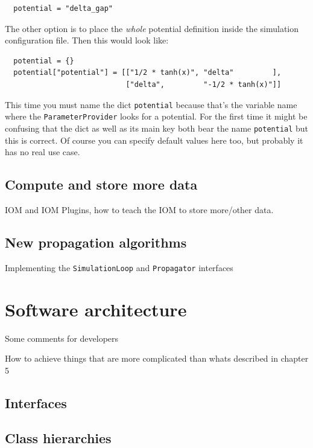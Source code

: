 \documentclass[a4paper,10pt]{report}
\begin{document}
\begin{verbatim}
  potential = "delta_gap"
\end{verbatim}

The other option is to place the \emph{whole} potential definition inside the
simulation configuration file. Then this would look like:

\begin{verbatim}
  potential = {}
  potential["potential"] = [["1/2 * tanh(x)", "delta"         ],
                            ["delta",         "-1/2 * tanh(x)"]]
\end{verbatim}

This time you must name the dict \texttt{potential} because that's the
variable name where the \texttt{ParameterProvider} looks for a potential.
For the first time it might be confusing that the dict as well as its main
key both bear the name \texttt{potential} but this is correct. Of course you
can specify default values here too, but probably it has no real use case.


\section{Compute and store more data}

IOM and IOM Plugins, how to teach the IOM to store more/other data.

\section{New propagation algorithms}

Implementing the \texttt{SimulationLoop} and \texttt{Propagator} interfaces



\chapter{Software architecture}

Some comments for developers

How to achieve things that are more complicated than whats
described in chapter 5

\section{Interfaces}

\section{Class hierarchies}
\end{document}
